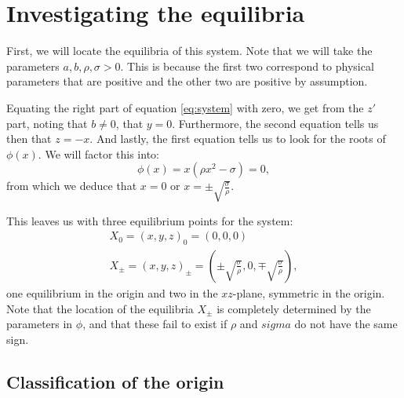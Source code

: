 \section{Investigating the equilibria}

First, we will locate the equilibria of this system.  Note that we
will take the parameters $a, b, \rho,\sigma > 0$.  This is because the
first two correspond to physical parameters that are positive and the
other two are positive by assumption.

Equating the right part of equation \ref{eq:system} with zero, we get
from the $z'$ part, noting that $b \neq 0$, that $y = 0$.
Furthermore, the second equation tells us then that $z = -x$.  And
lastly, the first equation tells us to look for the roots of
$\phi(x)$.  We will factor this into:
\begin{equation}
  \label{eq:phi-factor}
  \phi(x) = x ( \rho x^2 - \sigma ) = 0,
\end{equation}
from which we deduce that $x = 0$ or $x = \pm
\sqrt{\frac{\sigma}{\rho}}$.

This leaves us with three equilibrium points for the system:
\begin{gather}
  X_0 = (x,y,z)_0 = (0,0,0)\\
  X_\pm =(x,y,z)_\pm = (\pm\sqrt{\frac{\sigma}{\rho}}, 0,
  \mp\sqrt{\frac{\sigma}{\rho}}),
\end{gather}
one equilibrium in the origin and two in the $xz$-plane, symmetric in
the origin.  Note that the location of the equilibria $X_\pm$ is
completely determined by the parameters in $\phi$, and that these fail
to exist if $\rho$ and $sigma$ do not have the same sign.

\subsection{Classification of the origin}

